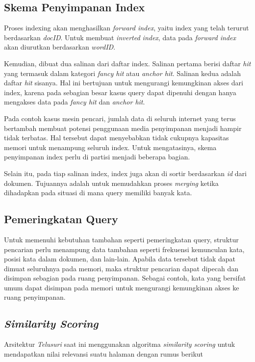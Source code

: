 \subsection{Skema Penyimpanan Index}

Proses indexing akan menghasilkan \emph{forward index}, yaitu index yang telah
terurut berdasarkan \textit{docID}. Untuk membuat \textit{inverted index}, data
pada \textit{forward index} akan diurutkan berdasarkan \textit{wordID}.

Kemudian, dibuat dua salinan dari daftar index. Salinan pertama berisi daftar
\emph{hit} yang termasuk dalam kategori \emph{fancy hit} atau \emph{anchor hit}.
Salinan kedua adalah daftar \emph{hit} sisanya. Hal ini bertujuan untuk
mengurangi kemungkinan akses dari index, karena pada sebagian besar kasus query
dapat dipenuhi dengan hanya mengakses data pada \emph{fancy hit} dan
\emph{anchor hit}.

Pada contoh kasus mesin pencari, jumlah data di seluruh internet yang terus
bertambah membuat potensi penggunaan media penyimpanan menjadi hampir tidak
terbatas. Hal tersebut dapat menyebabkan tidak cukupnya kapasitas memori untuk
menampung seluruh index. Untuk mengatasinya, skema penyimpanan index perlu di
partisi menjadi beberapa bagian.

Selain itu, pada tiap salinan index, index juga akan di sortir berdasarkan
\emph{id} dari dokumen. Tujuannya adalah untuk memudahkan proses \emph{merging}
ketika dihadapkan pada situasi di mana query memiliki banyak kata.

\subsection{Pemeringkatan Query}

Untuk memenuhi kebutuhan tambahan seperti pemeringkatan query, struktur
pencarian perlu menampung data tambahan seperti frekuensi kemunculan kata, 
posisi kata dalam dokumen, dan lain-lain. Apabila data tersebut tidak dapat
dimuat seluruhnya pada memori, maka struktur pencarian dapat dipecah dan
disimpan sebagian pada ruang penyimpanan. Sebagai contoh, kata yang bersifat
umum dapat disimpan pada memori untuk mengurangi kemungkinan akses ke ruang
penyimpanan.

\subsection{\textit{Similarity Scoring}}

Arsitektur \textit{Telusuri} saat ini menggunakan algoritma \textit{similarity 
scoring} untuk mendapatkan nilai relevansi suatu halaman dengan rumus berikut

